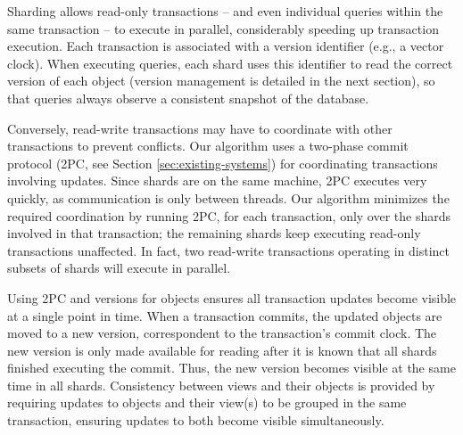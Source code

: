 Sharding allows read-only transactions -- and even individual queries within the same transaction -- to execute in parallel, considerably speeding up transaction execution.
Each transaction is associated with a version identifier (e.g., a vector clock).
When executing queries, each shard uses this identifier to read the correct version of each object (version management is detailed in the next section), so that queries always observe a consistent snapshot of the database.

Conversely, read-write transactions may have to coordinate with other transactions to prevent conflicts.
Our algorithm uses a two-phase commit protocol (2PC, see Section \ref{sec:existing-systems}) for coordinating transactions involving updates.
Since shards are on the same machine, 2PC executes very quickly, as communication is only between threads.
Our algorithm minimizes the required coordination by running 2PC, for each transaction, only over the shards involved in that transaction; the remaining shards keep executing read-only transactions unaffected.
In fact, two read-write transactions operating in distinct subsets of shards will execute in parallel.


Using 2PC and versions for objects ensures all transaction updates become visible at a single point in time.
When a transaction commits, the updated objects are moved to a new version, correspondent to the transaction's commit clock.
The new version is only made available for reading after it is known that all shards finished executing the commit.
Thus, the new version becomes visible at the same time in all shards.
Consistency between views and their objects is provided by requiring updates to objects and their view(s) to be grouped in the same transaction, ensuring updates to both become visible simultaneously.

